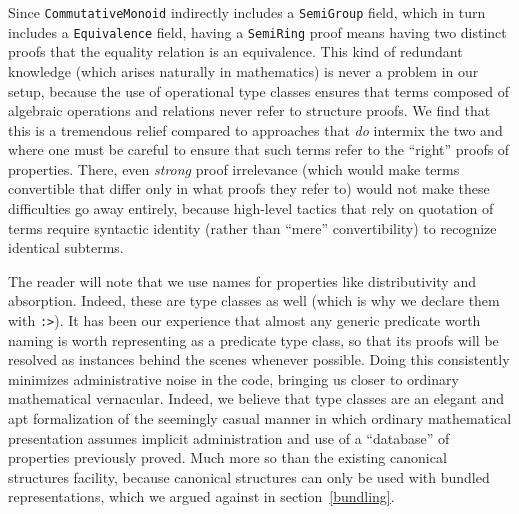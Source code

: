\documentclass[a4paper,10pt,runningheads]{llncs}
\begin{document}
Since \lstinline|CommutativeMonoid| indirectly includes a \lstinline|SemiGroup| field, which in turn includes a \lstinline|Equivalence| field, having a \lstinline|SemiRing| proof means having two distinct proofs that the equality relation is an equivalence. This kind of redundant knowledge (which arises naturally in mathematics) is never a problem in our setup, because the use of operational type classes ensures that terms composed of algebraic operations and relations never refer to structure proofs. We find that this is a tremendous relief compared to approaches that \emph{do} intermix the two and where one must be careful to ensure that such terms refer to the ``right'' proofs of properties. There, even \emph{strong} proof irrelevance (which would make terms convertible that differ only in what proofs they refer to) would not make these difficulties go away entirely, because high-level tactics that rely on quotation of terms require syntactic identity (rather than ``mere'' convertibility) to recognize identical subterms.


The reader will note that we use names for properties like distributivity and absorption. Indeed, these are type classes as well (which is why we declare them with \lstinline|:>|). It has been our experience that almost any generic predicate worth naming is worth representing as a predicate type class, so that its proofs will be resolved as instances behind the scenes whenever possible. Doing this consistently minimizes administrative noise in the code, bringing us closer to ordinary mathematical vernacular. Indeed, we believe that type classes are an elegant and apt formalization of the seemingly casual manner in which ordinary mathematical presentation assumes implicit administration and use of a ``database'' of properties previously proved. Much more so than the existing canonical structures facility, because canonical structures can only be used with bundled representations, which we argued against in section~\ref{bundling}.
\end{document}
